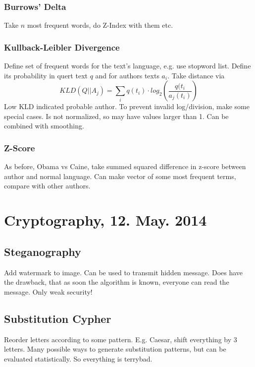\documentclass[11pt]{article}
\begin{document}
\subsubsection{Burrows' Delta}
Take $n$ most frequent words, do Z-Index with them etc.
\subsubsection{Kullback-Leibler Divergence}
Define set of frequent words for the text's language, e.g. use stopword list. 
Define its probability in quert text
 $q$ and for authors texts $a_i$. Take distance via
\begin{equation}
	KLD(Q|| A_j) = \sum_i q(t_i) \cdot log_2 \left( \frac{q(t_i}{a_j(t_i)} \right)
\end{equation}
Low KLD indicated probable author. To prevent invalid log/division, make some special cases.
Is not normalized, so may have values larger than 1. Can be combined with smoothing.
\subsubsection{Z-Score}
As before, Obama vs Caine, take summed squared difference in z-score between author and 
normal language. Can make vector of some most frequent terms, compare with other authors.

\section{Cryptography, 12. May. 2014}
\subsection{Steganography}
Add watermark to image. Can be used to transmit hidden message. Does have the drawback, that
as soon the algorithm is known, everyone can read the message. Only weak security!
\subsection{Substitution Cypher}
Reorder letters according to some pattern. E.g. Caesar, shift everything by 3 letters. 
Many possible ways to generate substitution patterns, but can be evaluated statistically.
So everything is terrybad.
\end{document}
